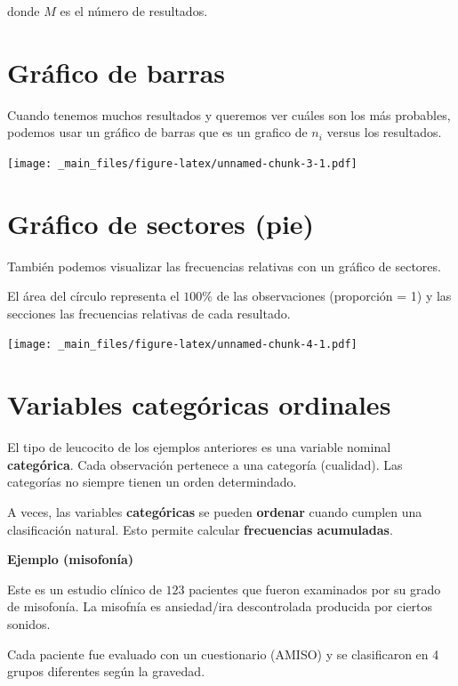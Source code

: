 \documentclass[
]{book}
\begin{document}
donde \(M\) es el número de resultados.

\hypertarget{gruxe1fico-de-barras}{%
\section{Gráfico de barras}\label{gruxe1fico-de-barras}}

Cuando tenemos muchos resultados y queremos ver cuáles son los más probables, podemos usar un gráfico de barras que es un grafico de \(n_i\) versus los resultados.

\texttt{[image: \_main\_files/figure-latex/unnamed-chunk-3-1.pdf]}

\hypertarget{gruxe1fico-de-sectores-pie}{%
\section{Gráfico de sectores (pie)}\label{gruxe1fico-de-sectores-pie}}

También podemos visualizar las frecuencias relativas con un gráfico de sectores.

El área del círculo representa el \(100\%\) de las observaciones (proporción = 1) y las secciones las frecuencias relativas de cada resultado.

\texttt{[image: \_main\_files/figure-latex/unnamed-chunk-4-1.pdf]}

\hypertarget{variables-categuxf3ricas-ordinales}{%
\section{Variables categóricas ordinales}\label{variables-categuxf3ricas-ordinales}}

El tipo de leucocito de los ejemplos anteriores es una variable nominal \textbf{categórica}. Cada observación pertenece a una categoría (cualidad). Las categorías no siempre tienen un orden determindado.

A veces, las variables \textbf{categóricas} se pueden \textbf{ordenar} cuando cumplen una clasificación natural. Esto permite calcular \textbf{frecuencias acumuladas}.

\textbf{Ejemplo (misofonía)}

Este es un estudio clínico de \(123\) pacientes que fueron examinados por su grado de misofonía. La misofnía es ansiedad/ira descontrolada producida por ciertos sonidos.

Cada paciente fue evaluado con un cuestionario (AMISO) y se clasificaron en 4 grupos diferentes según la gravedad.
\end{document}
